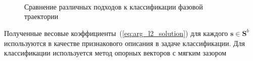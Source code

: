 \documentclass[12pt,twoside]{article}
\begin{document}
\begin{figure}[H]
\centering
{}\\
\\
\\
\caption{Сравнение различных подходов к классификации фазовой траектории}
\label{fg:alternative_piplines}
\end{figure}

Полученные весовые коэффициенты~(\ref{eq:arg_l2_solution}) для каждого $\mathbf{s} \in \mathbf{S}^{b}$ используются в качестве признакового описания в задаче классификации. Для классификации используется метод опорных векторов с мягким зазором
 
\end{document}
